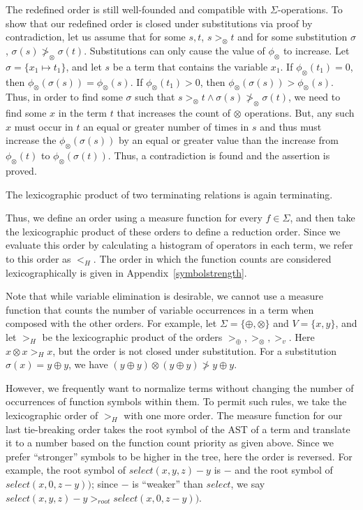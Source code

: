 \documentclass[sigplan,review,anonymous]{acmart}\settopmatter{printfolios=true,printccs=false,printacmref=false}
\begin{document}
The redefined order is still well-founded and compatible with $\Sigma$-operations. To show that our redefined order is closed under substitutions via proof by contradiction, let us assume that for some $s, t$, $s >_\otimes t$ and for some substitution $\sigma$, $\sigma(s) \ngtr_\otimes \sigma(t)$. Substitutions can only cause the value of $\phi_\otimes$ to increase. Let $\sigma = \{x_1 \mapsto t_1\}$, and let $s$ be a term that contains the variable $x_1$. If $\phi_\otimes(t_1) = 0$, then $\phi_\otimes(\sigma(s)) = \phi_\otimes(s)$. If $\phi_\otimes(t_1) > 0$, then $\phi_\otimes(\sigma(s)) > \phi_\otimes(s)$. Thus, in order to find some $\sigma$ such that $s >_\otimes t \wedge \sigma(s) \ngtr_\otimes \sigma(t)$, we need to find some $x$ in the term $t$ that increases the count of $\otimes$ operations. But, any such $x$ must occur in $t$ an equal or greater number of times in $s$ and thus must increase the $\phi_\otimes(\sigma(s))$ by an equal or greater value than the increase from $\phi_\otimes(t)$ to $\phi_\otimes(\sigma(t))$. Thus, a contradiction is found and the assertion is proved.


\begin{theorem}
The lexicographic product of two terminating relations is again terminating.
\end{theorem}

Thus, we define an order using a measure function for every $f \in \Sigma$, and then take the lexicographic product of these orders to define a reduction order. Since we evaluate this order by calculating a histogram of operators in each term, we refer to this order as $<_H$. The order in which the function counts are considered lexicographically is given in Appendix~\ref{symbolstrength}. 

Note that while variable elimination is desirable, we cannot use a measure function that counts the number of variable occurrences in a term when composed with the other orders. For example, let $\Sigma = \{\oplus, \otimes\}$ and $V = \{x, y\}$, and let $>_H$ be the lexicographic product of the orders $>_{\oplus}, >_{\otimes}, >_v$. Here $x \otimes x >_H x$, but the order is not closed under substitution. For a substitution $\sigma(x) = y \oplus y$, we have $(y \oplus y) \otimes (y \oplus y) \ngtr y \oplus y$. 

However, we frequently want to normalize terms without changing the number of occurrences of function symbols within them. To permit such rules, we take the lexicographic order of $>_H$ with one more order. The measure function for our last tie-breaking order takes the root symbol of the AST of a term and translate it to a number based on the function count priority as given above. Since we prefer ``stronger'' symbols to be higher in the tree, here the order is reversed. For example, the root symbol of $select(x, y, z) - y$ is $-$ and the root symbol of $select(x, 0, z - y))$; since $-$ is ``weaker'' than $select$, we say $select(x, y, z) - y >_{root} select(x, 0, z - y))$.
\end{document}
